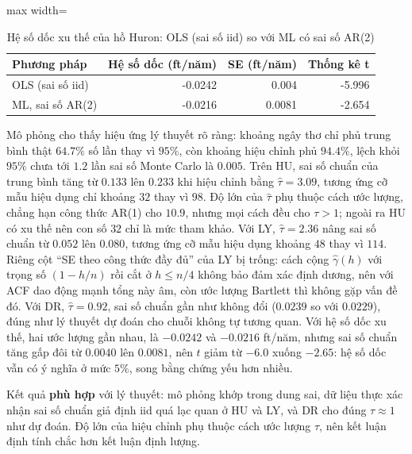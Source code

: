 \begin{table}[H]
\centering\footnotesize
\caption{Hệ số dốc xu thế của hồ Huron: OLS (sai số iid) so với ML có sai số AR(2)}\label{tab:tab_b11_03_slope_se}
\begin{adjustbox}{max width=\linewidth}
\begin{tabular}{|l|r|r|r|}
\toprule
Phương pháp & Hệ số dốc (ft/năm) & SE (ft/năm) & Thống kê t \\
\midrule
OLS (sai số iid) & -0.0242 & 0.004 & -5.996 \\
ML, sai số AR(2) & -0.0216 & 0.0081 & -2.654 \\
\bottomrule
\end{tabular}
\end{adjustbox}
\end{table}
 Mô phỏng cho thấy hiệu ứng lý thuyết rõ ràng: khoảng ngây thơ chỉ phủ trung bình thật $64.7\%$ số lần thay vì $95\%$, còn khoảng hiệu chỉnh phủ $94.4\%$, lệch khỏi $95\%$ chưa tới $1.2$ lần sai số Monte Carlo là $0.005$. Trên HU, sai số chuẩn của trung bình tăng từ $0.133$ lên $0.233$ khi hiệu chỉnh bằng $\hat\tau=3.09$, tương ứng cỡ mẫu hiệu dụng chỉ khoảng $32$ thay vì $98$. Độ lớn của $\hat\tau$ phụ thuộc cách ước lượng, chẳng hạn công thức AR(1) cho $10.9$, nhưng mọi cách đều cho $\tau>1$; ngoài ra HU có xu thế nên con số $32$ chỉ là mức tham khảo. Với LY, $\hat\tau=2.36$ nâng sai số chuẩn từ $0.052$ lên $0.080$, tương ứng cỡ mẫu hiệu dụng khoảng $48$ thay vì $114$. Riêng cột ``SE theo công thức đầy đủ'' của LY bị trống: cách cộng $\hat\gamma(h)$ với trọng số $(1-h/n)$ rồi cắt ở $h\le n/4$ không bảo đảm xác định dương, nên với ACF dao động mạnh tổng này âm, còn ước lượng Bartlett thì không gặp vấn đề đó. Với DR, $\hat\tau=0.92$, sai số chuẩn gần như không đổi ($0.0239$ so với $0.0229$), đúng như lý thuyết dự đoán cho chuỗi không tự tương quan. Với hệ số dốc xu thế, hai ước lượng gần nhau, là $-0.0242$ và $-0.0216$ ft/năm, nhưng sai số chuẩn tăng gấp đôi từ $0.0040$ lên $0.0081$, nên $t$ giảm từ $-6.0$ xuống $-2.65$: hệ số dốc vẫn có ý nghĩa ở mức $5\%$, song bằng chứng yếu hơn nhiều.

 Kết quả \textbf{phù hợp} với lý thuyết: mô phỏng khớp trong dung sai, dữ liệu thực xác nhận sai số chuẩn giả định iid quá lạc quan ở HU và LY, và DR cho đúng $\tau\approx1$ như dự đoán. Độ lớn của hiệu chỉnh phụ thuộc cách ước lượng $\tau$, nên kết luận định tính chắc hơn kết luận định lượng.

